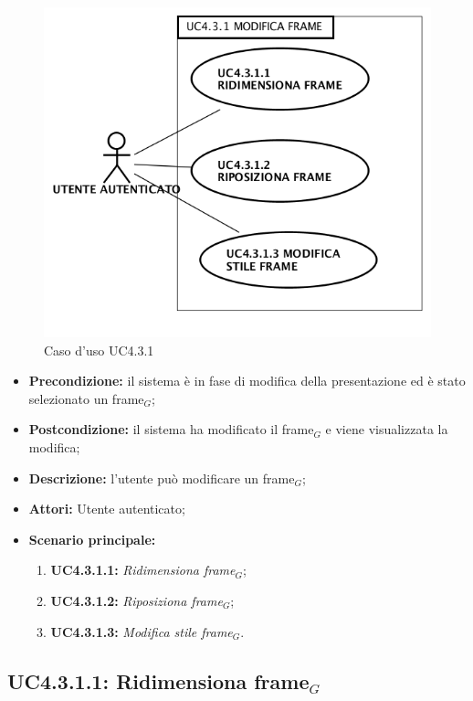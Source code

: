 \begin{figure}[H]
	\begin{center}
	\includegraphics[scale=0.4]{diagram/UC4-3-1.png}
	\caption{Caso d'uso UC4.3.1}
	\end{center}
\end{figure}
\begin{itemize}
	\item \textbf{Precondizione:} il sistema è in fase di modifica della presentazione ed è stato selezionato un frame$_G$;
	\item \textbf{Postcondizione:} il sistema ha modificato il frame$_G$ e viene visualizzata la modifica;
	\item \textbf{Descrizione:} l'utente può modificare un frame$_G$;
	\item \textbf{Attori:} Utente autenticato;
	\item \textbf{Scenario principale:}
	\begin{enumerate}
		\item \textbf{ UC4.3.1.1:} \textit{ Ridimensiona frame$_G$};
		\item \textbf{ UC4.3.1.2:} \textit{ Riposiziona frame$_G$};
		\item \textbf{ UC4.3.1.3:} \textit{ Modifica stile frame$_G$}.
	\end{enumerate}
\end{itemize}
\subsection{ UC4.3.1.1: Ridimensiona frame$_G$}

